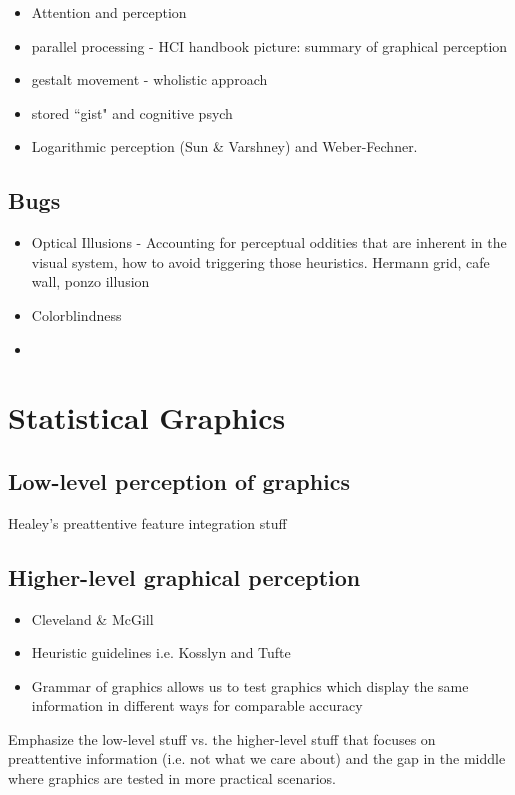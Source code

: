 \documentclass[11pt]{isuthesis}
\begin{document}
\begin{itemize}
\item Attention and perception

\item parallel processing - HCI handbook picture: summary of graphical perception

\item gestalt movement - wholistic approach

\item stored ``gist" and cognitive psych

\item Logarithmic perception (Sun \& Varshney) and Weber-Fechner. 
\end{itemize}

\subsection{Bugs}
\begin{itemize}
\item Optical Illusions - Accounting for perceptual oddities that are inherent in the visual system, how to avoid triggering those heuristics. Hermann grid, cafe wall, ponzo illusion
\item Colorblindness
\item 
\end{itemize}


\section{Statistical Graphics}
\subsection{Low-level perception of graphics}\label{LowLevelGraphics}
Healey's preattentive feature integration stuff
\subsection{Higher-level graphical perception}\label{HighLevelGraphics}
\begin{itemize}
\item Cleveland \& McGill
\item Heuristic guidelines i.e. Kosslyn and Tufte
\item Grammar of graphics allows us to test graphics which display the same information in different ways for comparable accuracy
\end{itemize}
Emphasize the low-level stuff vs. the higher-level stuff that focuses on preattentive information (i.e. not what we care about) and the gap in the middle where graphics are tested in more practical scenarios.
\end{document}
